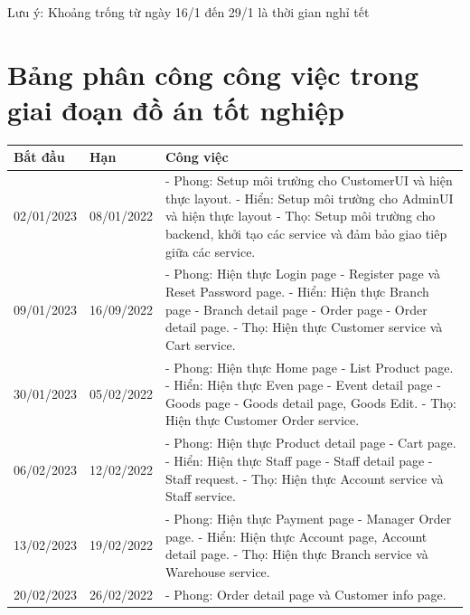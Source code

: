 Lưu ý: Khoảng trống từ ngày 16/1 đến 29/1 là thời gian nghỉ tết

\newpage
\section{Bảng phân công công việc trong giai đoạn đồ án tốt nghiệp}
{
\setlength\extrarowheight{6pt}
\begin{longtable}{| p{2cm} | p{2cm} | p{10cm} |}

	\hline
	\textbf{Bắt đầu} & \textbf{Hạn} & \textbf{Công việc} \\
	\hline
	02/01/2023 & 08/01/2022 & 
    - Phong: Setup môi trường cho CustomerUI và hiện thực layout. 
    \newline
    - Hiển: Setup môi trường cho AdminUI và hiện thực layout 
    \newline
    - Thọ: Setup môi trường cho backend, khởi tạo các service và đảm bảo giao tiêp giữa các service. \\
	\hline
	09/01/2023 & 16/09/2022 & 
    - Phong: Hiện thực Login page - Register page và Reset Password page. 
    \newline
    - Hiển: Hiện thực Branch page - Branch detail page - Order page - Order detail page. 
    \newline
    - Thọ: Hiện thực Customer service và Cart service. \\
	\hline
	30/01/2023 & 05/02/2022 & 
    - Phong: Hiện thực Home page - List Product page. 
    \newline
    - Hiển: Hiện thực Even page - Event detail page - Goods page - Goods detail page, Goods Edit. 
    \newline
    - Thọ: Hiện thực Customer Order service. \\
	\hline
	06/02/2023 & 12/02/2022 & 
    - Phong: Hiện thực Product detail page - Cart page. 
    \newline
    - Hiển: Hiện thực Staff page - Staff detail page - Staff request. 
    \newline
    - Thọ: Hiện thực Account service và Staff service. \\
	\hline
	13/02/2023 & 19/02/2022 & 
    - Phong: Hiện thực Payment page - Manager Order page. 
    \newline
    - Hiển: Hiện thực Account page, Account detail page. 
    \newline
    - Thọ: Hiện thực Branch service và Warehouse service. \\
	\hline
	20/02/2023 & 26/02/2022 & 
    - Phong: Order detail page và Customer info page. 

\end{longtable}}
